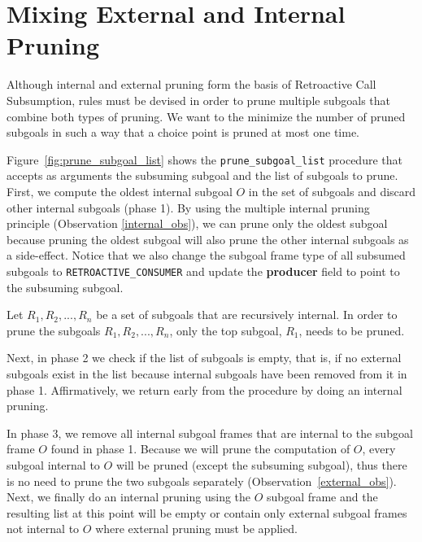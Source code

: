 \section{Mixing External and Internal Pruning}

Although internal and external pruning form the basis of Retroactive Call Subsumption, rules must
be devised in order to prune multiple subgoals that combine both types of pruning. We want to
the minimize the number of pruned subgoals in such a way that a choice point is pruned at
most one time.

Figure~\ref{fig:prune_subgoal_list} shows the \texttt{prune\_subgoal\_list} procedure that accepts
as arguments the subsuming subgoal and the list of subgoals to prune.
First, we compute the oldest internal subgoal $O$ in the set of subgoals and discard other internal
subgoals (phase 1). By using the multiple internal pruning principle (Observation \ref{internal_obs}),
we can prune only the oldest subgoal
because pruning the oldest subgoal will also prune the other internal subgoals as a side-effect.
Notice that we also change the subgoal frame type of all subsumed subgoals to \texttt{RETROACTIVE\_CONSUMER}
and update the \textbf{producer} field to point to the subsuming subgoal.

\begin{samepage}
\begin{pruning_obs}\label{internal_obs}
Let $R_1, R_2, ..., R_n$ be a set of subgoals that are recursively internal. In order to prune the subgoals
$R_1, R_2, ..., R_n$, only the top subgoal, $R_1$, needs to be pruned.
\end{pruning_obs}
\end{samepage}

Next, in phase 2 we check if the list of subgoals is empty, that is, if no external subgoals exist in the list
because internal subgoals have been removed from it in phase 1. Affirmatively, we return early from the procedure
by doing an internal pruning.

In phase 3, we remove all internal subgoal frames that are internal to the subgoal frame $O$ found in phase 1.
Because we will prune the computation of $O$, every subgoal internal to $O$ will be pruned
(except the subsuming subgoal), thus there is no need to prune the two subgoals separately
(Observation~\ref{external_obs}). Next, we finally do an internal pruning using the $O$ subgoal frame
and the resulting list at this point will be empty or contain only external subgoal frames not internal to
$O$ where external pruning must be applied.

